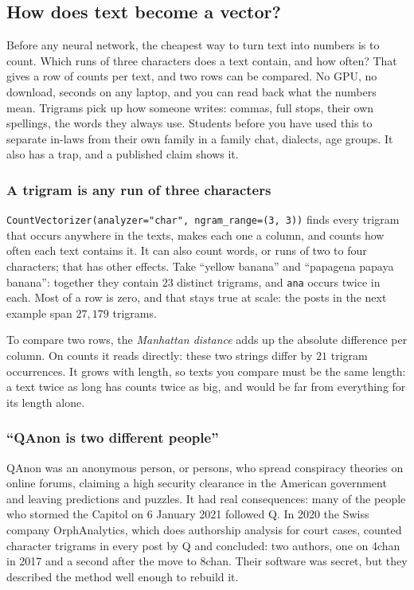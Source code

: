 \documentclass[12pt, a4paper]{article}
\theoremstyle{definition}
\theoremstyle{remark}
\begin{document}
\subsection{How does text become a vector?}
\label{sec:trigrams}
Before any neural network, the cheapest way to turn text into numbers is to count. Which runs of three characters does a text contain, and how often? That gives a row of counts per text, and two rows can be compared. No GPU, no download, seconds on any laptop, and you can read back what the numbers mean. Trigrams pick up how someone writes: commas, full stops, their own spellings, the words they always use. Students before you have used this to separate in-laws from their own family in a family chat, dialects, age groups. It also has a trap, and a published claim shows it.

\subsubsection{A trigram is any run of three characters}
\texttt{CountVectorizer(analyzer="char", ngram\_range=(3, 3))} finds every trigram that occurs anywhere in the texts, makes each one a column, and counts how often each text contains it. It can also count words, or runs of two to four characters; that has other effects. Take ``yellow banana'' and ``papagena papaya banana'': together they contain $23$ distinct trigrams, and \texttt{ana} occurs twice in each. Most of a row is zero, and that stays true at scale: the posts in the next example span $27{,}179$ trigrams.

To compare two rows, the \emph{Manhattan distance} adds up the absolute difference per column. On counts it reads directly: these two strings differ by $21$ trigram occurrences. It grows with length, so texts you compare must be the same length: a text twice as long has counts twice as big, and would be far from everything for its length alone.

\subsubsection{``QAnon is two different people''}
QAnon was an anonymous person, or persons, who spread conspiracy theories on online forums, claiming a high security clearance in the American government and leaving predictions and puzzles. It had real consequences: many of the people who stormed the Capitol on 6 January 2021 followed Q. In 2020 the Swiss company OrphAnalytics, which does authorship analysis for court cases, counted character trigrams in every post by Q and concluded: two authors, one on 4chan in 2017 and a second after the move to 8chan. Their software was secret, but they described the method well enough to rebuild it.
\end{document}
